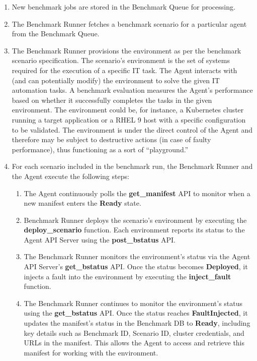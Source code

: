 \begin{enumerate}[left=0pt, topsep=0pt, partopsep=0pt, itemsep=0pt, parsep=0pt]
    \item New benchmark jobs are stored in the Benchmark Queue for processing.
    \item The Benchmark Runner fetches a benchmark scenario for a particular agent from the Benchmark Queue.
    \item The Benchmark Runner provisions the environment as per the benchmark scenario specification.
    The scenario's environment is the set of systems required for the execution of a specific IT task.%
    The Agent interacts with (and can potentially modify) the environment  to solve the given IT automation tasks. A benchmark evaluation measures the Agent's performance based on whether it successfully completes the tasks in the given environment. 
    The environment could be, for instance, a Kubernetes cluster running a target application or a RHEL 9 host with a specific configuration to be validated. 
    The environment is under the direct control of the Agent and therefore may be subject to destructive actions (in case of faulty performance), thus functioning as a sort of ``playground.''
    \item For each scenario included in the benchmark run, the Benchmark Runner and the Agent execute the following steps:
        \begin{enumerate}
            \item The Agent continuously polls the \textbf{get\_manifest} API to monitor when a new manifest enters the \textbf{Ready} state.
            \item Benchmark Runner deploys the scenario's environment by executing the \textbf{deploy\_scenario} function. Each environment reports its status to the Agent API Server using the \textbf{post\_bstatus} API.
            \item The Benchmark Runner monitors the environment's status via the Agent API Server's \textbf{get\_bstatus} API. Once the status becomes \textbf{Deployed}, it injects a fault into the environment by executing the \textbf{inject\_fault} function.
            \item The Benchmark Runner continues to monitor the environment's status using the \textbf{get\_bstatus} API. Once the status reaches \textbf{FaultInjected}, it updates the manifest's status in the Benchmark DB to \textbf{Ready}, including key details such as Benchmark ID, Scenario ID, cluster credentials, and URLs in the manifest. This allows the Agent to access and retrieve this manifest for working with the environment.

\end{enumerate}
\end{enumerate}
